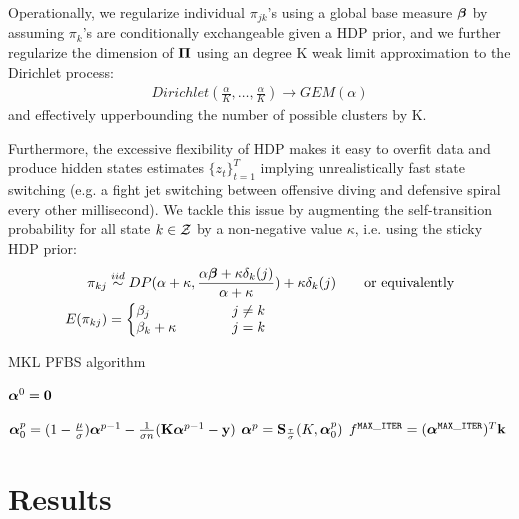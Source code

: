 \documentclass{article} %
\begin{document}
Operationally, we regularize individual $\pi_{jk}$'s using a global base measure $\boldsymbol{\beta}$ by assuming $\pi_k$'s are conditionally exchangeable given a HDP prior, and we further regularize the dimension of $\boldsymbol{\Pi}$ using an degree K weak limit approximation to the Dirichlet process:
\begin{align*}
Dirichlet(\frac{\alpha}{K}, \dots, \frac{\alpha}{K}) \rightarrow GEM(\alpha)
\end{align*}
and effectively upperbounding the number of possible clusters by K.

Furthermore, the excessive flexibility of HDP makes it easy to overfit data and produce hidden states estimates $\{z_t\}_{t=1}^T$ implying unrealistically fast state switching (e.g. a fight jet switching between offensive diving and defensive spiral every other millisecond). We tackle this issue by augmenting the self-transition probability for all state $k \in {\cal Z}$ by a non-negative value $\kappa$, i.e. using the sticky HDP prior:
\begin{align*}
\pi_{kj} &\stackrel{iid}{\sim}
DP(\alpha + \kappa, \frac{\alpha\bbeta + \kappa \delta_k(j)}{\alpha + \kappa}) + \kappa \delta_k(j) \qquad \mbox{or equivalently}\\
E(\pi_{kj}) &=
\left\{\begin{matrix*}[l]
\beta_j \qquad &&  j \neq k
\\
\beta_k + \kappa \qquad &&  j = k
\end{matrix*}\right.
\end{align*}

\begin{algorithm}[H]
\caption{MKL PFBS algorithm}
\label{alg:MKL}
\begin{algorithmic}[1]
\State $\boldsymbol{\alpha}^0={\bf 0}$

\State
$\boldsymbol{\alpha}_0^{p} = (1-\frac{\mu}{\sigma})\boldsymbol{\alpha}^{p-1} - \frac{1}{\sigma n}({\bf K}\boldsymbol{\alpha}^{p-1} - {\bf y}) $
\State
$\boldsymbol{\alpha}^p =
  {\bf S}_{\frac{\tau}{\sigma}}(K, \boldsymbol{\alpha}_0^{p})$
\EndFor
\State \Return $f^{\tt MAX\_ITER} = (\boldsymbol{\alpha}^{\tt MAX\_ITER})^T{\bf k}$
\EndProcedure
\end{algorithmic}
\end{algorithm}

\newpage
\section{Results}
\end{document}
